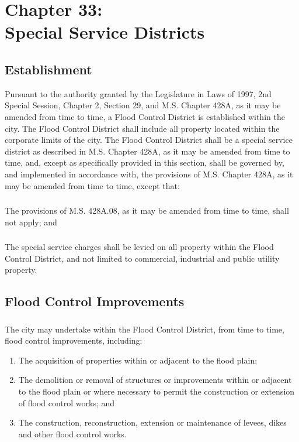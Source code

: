 \chapter*{Chapter 33: \\
	Special Service Districts}
    \vfill
    \minitoc
    \pagebreak
    

\section{Establishment}
Pursuant to the authority granted by the Legislature in Laws of 1997, 2nd Special Session, Chapter 2, Section 29, and M.S. Chapter 428A, as it may be amended from time to time, a Flood Control District is established within the city.  The Flood Control District shall include all property located within the corporate limits of the city.  The Flood Control District shall be a special service district as described in M.S. Chapter 428A, as it may be amended from time to time, and, except as specifically provided in this section, shall be governed by, and implemented in accordance with, the provisions of M.S. Chapter 428A, as it may be amended from time to time, except that:
\subsection{}
The provisions of M.S. \textsection 428A.08, as it may be amended from time to time, shall not apply; and
\subsection{}
The special service charges shall be levied on all property within the Flood Control District, and not limited to commercial, industrial and public utility property.

\section{Flood Control Improvements}
\subsection{}
The city may undertake within the Flood Control District, from time to time, flood control improvements, including:
\begin{enumerate}
    \item The acquisition of properties within or adjacent to the flood plain;
    \item The demolition or removal of structures or improvements within or adjacent to the flood plain or where necessary to permit the construction or extension of flood control works; and
    \item The construction, reconstruction, extension or maintenance of levees, dikes and other flood control works.
\end{enumerate}
